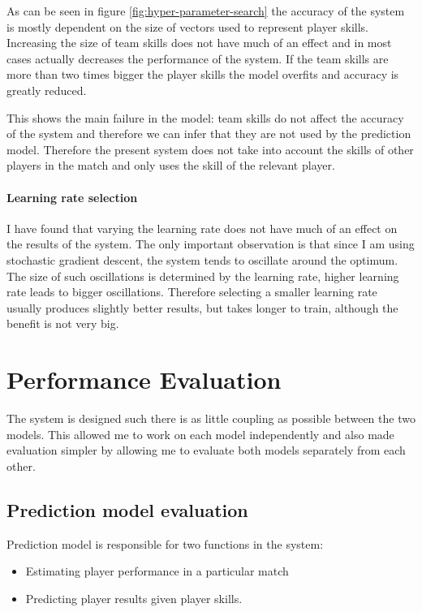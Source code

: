\documentclass[12pt,a4paper]{book}
\begin{document}
As can be seen in figure \ref{fig:hyper-parameter-search} the accuracy of the system is mostly dependent on the size of vectors used to represent player skills.
Increasing the size of team skills does not have much of an effect and in most cases actually decreases the performance of the system.
If the team skills are more than two times bigger the player skills the model overfits and accuracy is greatly reduced.

This shows the main failure in the model: team skills do not affect the accuracy of the system and therefore we can infer that they are not used by the prediction model.
Therefore the present system does not take into account the skills of other players in the match and only uses the skill of the relevant player.

\paragraph{Learning rate selection}
I have found that varying the learning rate does not have much of an effect on the results of the system.
The only important observation is that since I am using stochastic gradient descent, the system tends to oscillate around the optimum.
The size of such oscillations is determined by the learning rate, higher learning rate leads to bigger oscillations.
Therefore selecting a smaller learning rate usually produces slightly better results, but takes longer to train, although the benefit is not very big.

\section{Performance Evaluation}
The system is designed such there is as little coupling as possible between the two models.
This allowed me to work on each model independently and also made evaluation simpler by allowing me to evaluate both models separately from each other.
\subsection{Prediction model evaluation}
Prediction model is responsible for two functions in the system:
\begin{itemize}
\item Estimating player performance in a particular match
\item Predicting player results given player skills.
\end{itemize}
\end{document}
